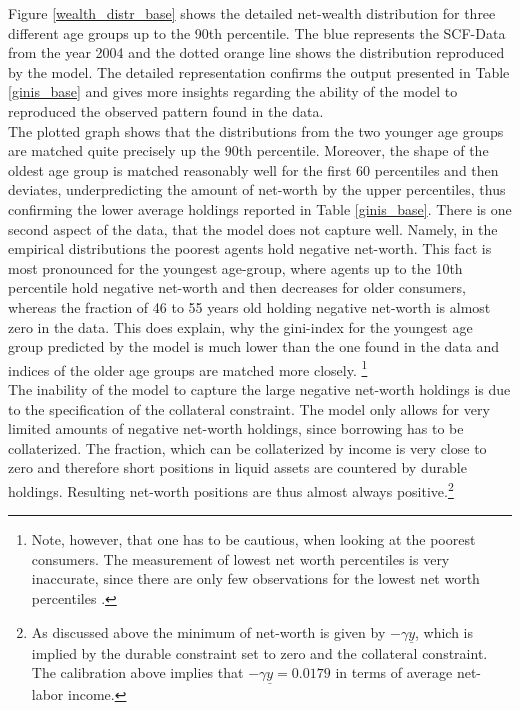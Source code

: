 \documentclass[12pt,a4paper,leqno]{article}
\theoremstyle{definition}
\begin{document}
Figure \ref{wealth_distr_base} shows the detailed net-wealth distribution for three different age groups up to the 90th percentile. The blue represents the SCF-Data from the year 2004 and the dotted orange line shows the distribution reproduced by the model. The detailed representation confirms the output presented in Table \ref{ginis_base} and gives more insights regarding the ability of the model to reproduced the observed pattern found in the data. \\ 
The plotted graph shows that the distributions from the two younger age groups are matched quite precisely up the 90th percentile. Moreover, the shape of the oldest age group is matched reasonably well for the first 60 percentiles and then deviates, underpredicting the amount of net-worth by the upper percentiles, thus confirming the lower average holdings reported in Table \ref{ginis_base}. There is one second aspect of the data, that the model does not capture well. Namely, in the empirical distributions the poorest agents hold negative net-worth. This fact is most pronounced for the youngest age-group, where agents up to the 10th percentile hold negative net-worth and then decreases for older consumers, whereas the fraction of 46 to 55 years old holding negative net-worth is almost zero in the data. This does explain, why the gini-index for the youngest age group predicted by the model is much lower than the one found in the data and indices of the older age groups are matched more closely. \footnote{Note, however, that one has to be cautious, when looking at the poorest consumers. The measurement of lowest net worth percentiles is very inaccurate, since there are only few observations for the lowest net worth percentiles \citep{hintermaier2011}.} 
\\ The inability of the model to capture the large negative net-worth holdings is due to the specification of the collateral constraint. The model only allows for very limited amounts of negative net-worth holdings, since borrowing has to be collaterized. The fraction, which can be collaterized by income is very close to zero and therefore short positions in liquid assets are countered by durable holdings. Resulting net-worth positions are thus almost always positive.\footnote{As discussed above the minimum of net-worth is given by $-\gamma\underline{y}$, which is implied by the durable constraint set to zero and the collateral constraint. The calibration above implies that $-\gamma\underline{y} = 0.0179$ in terms of average net-labor income.} 
\end{document}
